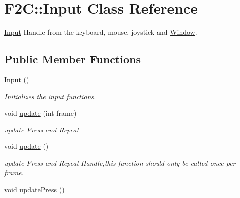 \hypertarget{class_f2_c_1_1_input}{
\section{F2C::Input Class Reference}
\label{class_f2_c_1_1_input}
}


\hyperlink{class_f2_c_1_1_input}{Input} Handle from the keyboard, mouse, joystick and \hyperlink{class_f2_c_1_1_window}{Window}.  


\subsection*{Public Member Functions}
\begin{DoxyCompactItemize}
\item 
\hypertarget{class_f2_c_1_1_input_a02818fd4fd45404f7731709bf1aba6b8}{
\hyperlink{class_f2_c_1_1_input_a02818fd4fd45404f7731709bf1aba6b8}{Input} ()}
\label{class_f2_c_1_1_input_a02818fd4fd45404f7731709bf1aba6b8}

\begin{DoxyCompactList}\small\item\em Initializes the input functions. \item\end{DoxyCompactList}\item 
void \hyperlink{class_f2_c_1_1_input_ab838e59b463c285559226d2ca99c30ef}{update} (int frame)
\begin{DoxyCompactList}\small\item\em update Press and Repeat. \item\end{DoxyCompactList}\item 
\hypertarget{class_f2_c_1_1_input_a32e688e7274cd0536c6fb10a85216590}{
void \hyperlink{class_f2_c_1_1_input_a32e688e7274cd0536c6fb10a85216590}{update} ()}
\label{class_f2_c_1_1_input_a32e688e7274cd0536c6fb10a85216590}

\begin{DoxyCompactList}\small\item\em update Press and Repeat Handle,this function should only be called once per frame. \item\end{DoxyCompactList}\item 
\hypertarget{class_f2_c_1_1_input_a6f9a88f45293e60c476637f6ffd06430}{
void \hyperlink{class_f2_c_1_1_input_a6f9a88f45293e60c476637f6ffd06430}{updatePress} ()}
\label{class_f2_c_1_1_input_a6f9a88f45293e60c476637f6ffd06430}


\end{DoxyCompactItemize}
